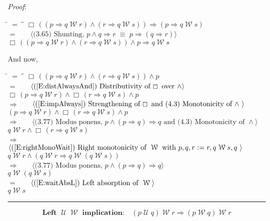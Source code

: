 \documentclass[12pt, fleqn, leqno]{article}
\newcommand{\lgap}{2pt}                             %
\newcommand{\mymathindent}{24pt}                    %
\newcommand{\equivs}{\ensuremath{\;\equiv\;}}       %
\newcommand{\impl}{\ensuremath{\Rightarrow}}        %
\newcommand{\Until}{\;\mathcal{U}\;}
\newcommand{\Wait}{\;\mathcal{W}\;}
\newcommand{\Always}{\Box\,}
\newcommand{\myqed}{\rule[-.23ex]{1.2ex}{2.0ex}}
\newcommand{\myqedtab}{\hspace{384pt}}              %
\newcommand{\Gll} {\langle}                         %
\newcommand{\Ggg} {\rangle}                         %
\newcommand{\Hint}[1]     {\ \ \ $\Gll              \mbox{#1} \Ggg$ }   %
\begin{document}
\emph{Proof}:
\begin{tabbing}
\hspace{\mymathindent} \= $= \;$ \= \myqedtab \= \kill
  \> \>   $\Always ((p \impl q \Wait r) \land (r \impl q \Wait s)) \impl (p \impl q \Wait s)$\\[\lgap]
  \> $=$  \>  \Hint{(3.65) Shunting, $p\land q\impl r\equivs p\impl (q\impl r)$}\\[\lgap]
  \> \>   $\Always ((p \impl q \Wait r) \land (r \impl q \Wait s)) \land p \impl q \Wait s$
\end{tabbing}
And now,
\begin{tabbing}
\hspace{\mymathindent} \= $= \;$ \= \myqedtab \= \kill
  \> \>   $\Always ((p \impl q \Wait r) \land (r \impl q \Wait s)) \land p$\\[\lgap]
  \> $=$  \>  \Hint{(\ref{E:distAlwaysAnd}) Distributivity of $\Always$ over $\land$}\\[\lgap]
  \> \>   $\Always (p \impl q \Wait r) \land \Always (r \impl q \Wait s) \land p$\\[\lgap]
  \> $\impl$  \>  \Hint{(\ref{E:impAlways}) Strengthening of $\Always$ and (4.3) Monotonicity of $\land$ }\\[\lgap]
  \> \>   $(p \impl q \Wait r) \land \Always (r \impl q \Wait s) \land p$\\[\lgap]
  \> $\impl$  \>  \Hint{(3.77) Modus ponens, $p\land (p\impl q)\impl q$ and (4.3) Monotonicity of $\land$}\\[\lgap]
  \> \>   $q \Wait r \land \Always (r \impl q \Wait s)$\\[\lgap]
  \> $\impl$  \>  \Hint{(\ref{E:rightMonoWait}) Right monotonicity of $\Wait$ with $p, q, r := r, q \Wait s, q$ }\\[\lgap]
  \> \>   $q \Wait r \land (q\Wait r \impl q\Wait(q\Wait s))$\\[\lgap]
  \> $\impl$  \>  \Hint{(3.77) Modus ponens, $p\land (p\impl q)\impl q$}\\[\lgap]
  \> \>   $q \Wait (q \Wait s)$\\[\lgap]  
  \> $=$  \>  \Hint{(\ref{E:waitAbsL}) Left absorption of $\Wait$}\\[\lgap]
  \> \>   $q \Wait s$ \quad \myqed
\end{tabbing}
\begin{equation}\label{E:LeftUntilWaitImpl}
\textbf{Left $\Until\Wait$ implication:}\quad (p\Until q)\Wait r\impl (p\Wait q)\Wait r
\end{equation}
\end{document}

